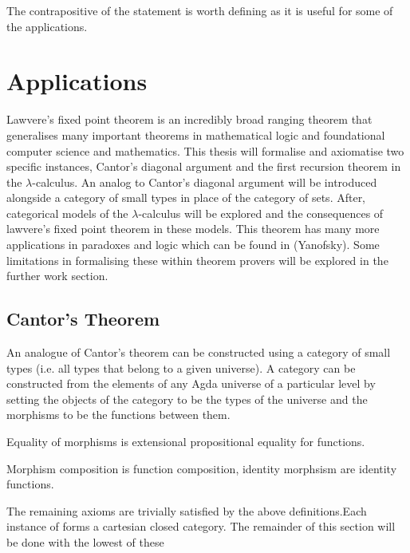 The contrapositive of the statement is worth defining as it is useful for some
of the applications.

\section{Applications}

Lawvere's fixed point theorem is an incredibly broad ranging theorem that
generalises many important theorems in mathematical logic and foundational
computer science and mathematics. This thesis will formalise and axiomatise two
specific instances, Cantor's diagonal argument and the first recursion theorem
in the $\lambda$-calculus. An analog to Cantor's diagonal argument will be introduced
alongside a category of small types in place of the category of sets.
After, categorical models of the $\lambda$-calculus will be explored and the
consequences of lawvere's fixed point theorem in these models. This theorem has
many more applications in paradoxes and logic which can be found in (Yanofsky).
Some limitations in formalising these within theorem provers will be explored in
the further work section.

\subsection{Cantor's Theorem}
An analogue of Cantor's theorem can be constructed using a category of small
types (i.e. all types that belong to a given universe). A category can be
constructed from the elements of any Agda universe of a particular level by
setting the objects of the category to be the types of the universe and the
morphisms to be the functions between them.


 Equality of morphisms is extensional propositional equality for functions.


Morphism composition is function composition, identity morphsism are identity
functions.


The remaining axioms are trivially satisfied by the above definitions.Each
instance of  forms a cartesian closed category. The remainder
of this section will be done with the lowest of these

